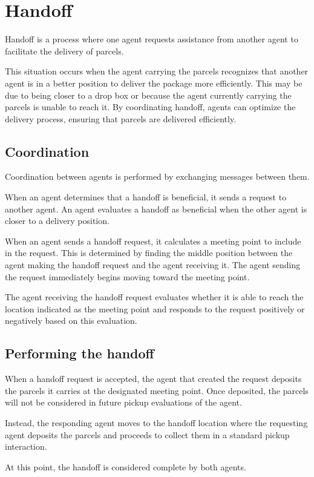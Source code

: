 \section{Handoff}

Handoff is a process where one agent requests assistance from another agent to facilitate the delivery of parcels.

This situation occurs when the agent carrying the parcels recognizes that another agent is in a better position to deliver the package more efficiently.
This may be due to being closer to a drop box or because the agent currently carrying the parcels is unable to reach it.
By coordinating handoff, agents can optimize the delivery process, ensuring that parcels are delivered efficiently.

\subsection{Coordination}

Coordination between agents is performed by exchanging messages between them.

When an agent determines that a handoff is beneficial, it sends a request to another agent.
An agent evaluates a handoff as beneficial when the other agent is closer to a delivery position.

When an agent sends a handoff request, it calculates a meeting point to include in the request.
This is determined by finding the middle position between the agent making the handoff request and the agent receiving it.
The agent sending the request immediately begins moving toward the meeting point.

The agent receiving the handoff request evaluates whether it is able to reach the location indicated as the meeting point and responds to the request positively or negatively based on this evaluation.

\subsection{Performing the handoff}

When a handoff request is accepted, the agent that created the request deposits the parcels it carries at the designated meeting point.
Once deposited, the parcels will not be considered in future pickup evaluations of the agent.

Instead, the responding agent moves to the handoff location where the requesting agent deposits the parcels and proceeds to collect them in a standard pickup interaction.

At this point, the handoff is considered complete by both agents.
